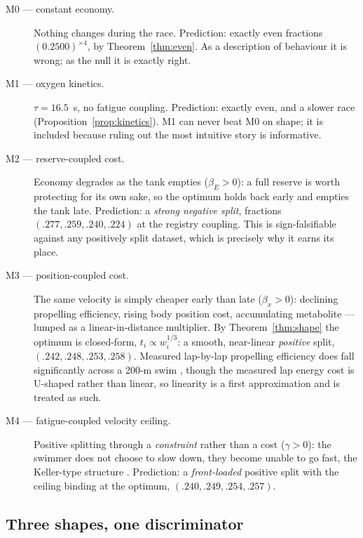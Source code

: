 \begin{description}
\item[M0 — constant economy.] Nothing changes during the race. Prediction:
exactly even fractions $(0.2500)^{\times 4}$, by Theorem~\ref{thm:even}. As a
description of behaviour it is wrong; as the null it is exactly right.

\item[M1 — oxygen kinetics.] $\tau = 16.5$~s, no fatigue coupling.
Prediction: exactly even, and a slower race
(Proposition~\ref{prop:kinetics}). M1 can never beat M0 on shape; it is
included because ruling out the most intuitive story is informative.

\item[M2 — reserve-coupled cost.] Economy degrades as the tank empties
($\beta_E > 0$): a full reserve is worth protecting for its own sake, so the
optimum holds back early and empties the tank late. Prediction: a
\emph{strong negative split}, fractions $(.277, .259, .240, .224)$ at the
registry coupling. This is sign-falsifiable against any positively split
dataset, which is precisely why it earns its place.

\item[M3 — position-coupled cost.] The same velocity is simply cheaper early
than late ($\beta_x > 0$): declining propelling efficiency, rising body
position cost, accumulating metabolite --- lumped as a linear-in-distance
multiplier. By Theorem~\ref{thm:shape} the optimum is closed-form,
$t_i \propto w_i^{1/3}$: a smooth, near-linear \emph{positive} split,
$(.242, .248, .253, .258)$. Measured lap-by-lap propelling efficiency does
fall significantly across a 200-m swim \citep{figueiredo2011energy}, though
the measured lap energy cost is U-shaped rather than linear, so linearity is
a first approximation and is treated as such.

\item[M4 — fatigue-coupled velocity ceiling.] Positive splitting through a
\emph{constraint} rather than a cost ($\gamma > 0$): the swimmer does not
choose to slow down, they become unable to go fast, the Keller-type
structure \citep{keller1973theory, mathis1989fatigue}. Prediction: a
\emph{front-loaded} positive split with the ceiling binding at the optimum,
$(.240, .249, .254, .257)$.
\end{description}

\subsection{Three shapes, one discriminator}

